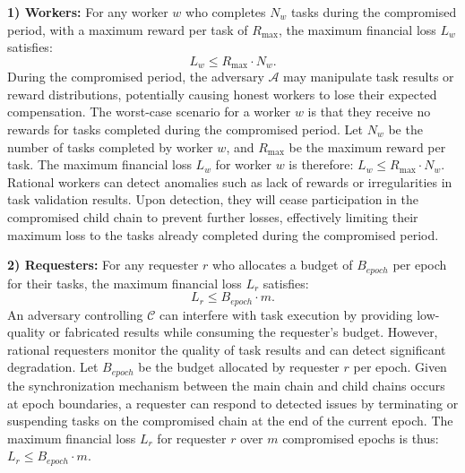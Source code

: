 \documentclass[10pt,journal]{IEEEtran}
\begin{document}
\noindent\textbf{1) Workers:} For any worker $w$ who completes $N_w$ tasks during the compromised period, with a maximum reward per task of $R_{\max}$, the maximum financial loss $L_w$ satisfies:
    \begin{equation}
        L_w \leq R_{\max} \cdot N_w.
    \end{equation}
    During the compromised period, the adversary $\mathcal{A}$ may manipulate task results or reward distributions, potentially causing honest workers to lose their expected compensation. The worst-case scenario for a worker $w$ is that they receive no rewards for tasks completed during the compromised period. Let $N_w$ be the number of tasks completed by worker $w$, and $R_{\max}$ be the maximum reward per task. The maximum financial loss $L_w$ for worker $w$ is therefore: $ L_w \leq R_{\max} \cdot N_w$. Rational workers can detect anomalies such as lack of rewards or irregularities in task validation results. Upon detection, they will cease participation in the compromised child chain to prevent further losses, effectively limiting their maximum loss to the tasks already completed during the compromised period.

\noindent\textbf{2) Requesters:} For any requester $r$ who allocates a budget of $B_{epoch}$ per epoch for their tasks, the maximum financial loss $L_r$ satisfies:
    \begin{equation}
        L_r \leq B_{epoch} \cdot m.
    \end{equation}
    An adversary controlling $\mathcal{C}$ can interfere with task execution by providing low-quality or fabricated results while consuming the requester's budget. However, rational requesters monitor the quality of task results and can detect significant degradation. Let $B_{epoch}$ be the budget allocated by requester $r$ per epoch. Given the synchronization mechanism between the main chain and child chains occurs at epoch boundaries, a requester can respond to detected issues by terminating or suspending tasks on the compromised chain at the end of the current epoch. The maximum financial loss $L_r$ for requester $r$ over $m$ compromised epochs is thus: $L_r \leq B_{epoch} \cdot m $. 
    
\end{document}
